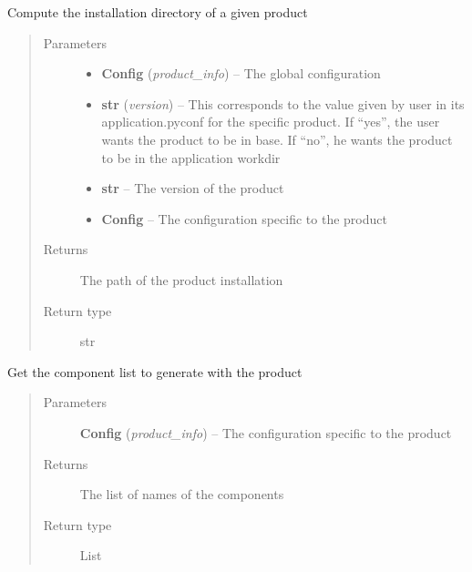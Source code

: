 \documentclass[a4paper,10pt,english]{sphinxmanual}
\begin{document}

\begin{fulllineitems}
\label{commands/apidoc/src:src.product.get_install_dir}
Compute the installation directory of a given product
\begin{quote}\begin{description}
\item[{Parameters}] \leavevmode\begin{itemize}
\item {} 
\textbf{Config} (\emph{product\_info}) -- The global configuration

\item {} 
\textbf{str} (\emph{version}) -- This corresponds to the value given by user in its 
application.pyconf for the specific product. If ``yes'', the
user wants the product to be in base. If ``no'', he wants the
product to be in the application workdir

\item {} 
\textbf{str} -- The version of the product

\item {} 
\textbf{Config} -- The configuration specific to 
the product

\end{itemize}

\item[{Returns}] \leavevmode
The path of the product installation

\item[{Return type}] \leavevmode
str

\end{description}\end{quote}

\end{fulllineitems}


\begin{fulllineitems}
\label{commands/apidoc/src:src.product.get_product_components}
Get the component list to generate with the product
\begin{quote}\begin{description}
\item[{Parameters}] \leavevmode
\textbf{Config} (\emph{product\_info}) -- The configuration specific to 
the product

\item[{Returns}] \leavevmode
The list of names of the components

\item[{Return type}] \leavevmode
List

\end{description}\end{quote}

\end{fulllineitems}
\end{document}
